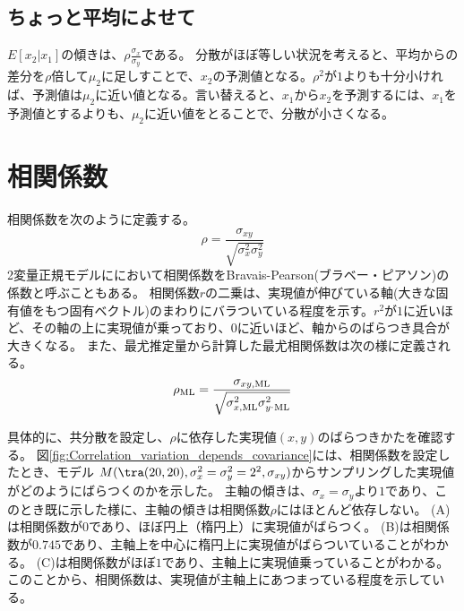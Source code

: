 \subsection{ちょっと平均によせて}
$E[x_2|x_1]$の傾きは、$\rho\frac{\sigma_x}{\sigma_y}$である。
分散がほぼ等しい状況を考えると、平均からの差分を$\rho$倍して$\mu_2$に足しすことで、$x_2$の予測値となる。$\rho^2$が$1$よりも十分小ければ、予測値は$\mu_2$に近い値となる。言い替えると、$x_1$から$x_2$を予測するには、$x_1$を予測値とするよりも、$\mu_2$に近い値をとることで、分散が小さくなる。



\section{相関係数}
相関係数を次のように定義する。
\begin{equation*}
 \rho = \frac{\sigma_{xy}}{\sqrt{\sigma_x^2\sigma_y^2}}
\end{equation*}
2変量正規モデルににおいて相関係数をBravais-Pearson(ブラベー・ピアソン)の係数と呼ぶこともある。
相関係数$r$の二乗は、実現値が伸びている軸(大きな固有値をもつ固有ベクトル)のまわりにバラついている程度を示す。$r^2$が$1$に近いほど、その軸の上に実現値が乗っており、$0$に近いほど、軸からのばらつき具合が大きくなる。
また、最尤推定量から計算した最尤相関係数は次の様に定義される。
\begin{equation*}
 \rho_{\rm{ML}} = \frac{\sigma_{xy,\rm{ML}}}{\sqrt{\sigma_{x,\rm{ML}}^2\sigma_{y^,\rm{ML}}^2}}
\end{equation*}


具体的に、共分散を設定し、$\rho$に依存した実現値$(x,y)$のばらつきかたを確認する。
図\ref{fig:Correlation_variation_depends_covariance}には、相関係数を設定したとき、モデル
$M(\tra(20,20),\sigma_x^2=\sigma_y^2=2^2,\sigma_{xy})$からサンプリングした実現値がどのようにばらつくのかを示した。
主軸の傾きは、$\sigma_x=\sigma_y$より$1$であり、このとき既に示した様に、主軸の傾きは相関係数$\rho$にはほとんど依存しない。
(A)は相関係数が$0$であり、ほぼ円上（楕円上）に実現値がばらつく。
(B)は相関係数が$0.745$であり、主軸上を中心に楕円上に実現値がばらついていることがわかる。
(C)は相関係数がほぼ$1$であり、主軸上に実現値乗っていることがわかる。
このことから、相関係数は、実現値が主軸上にあつまっている程度を示している。


